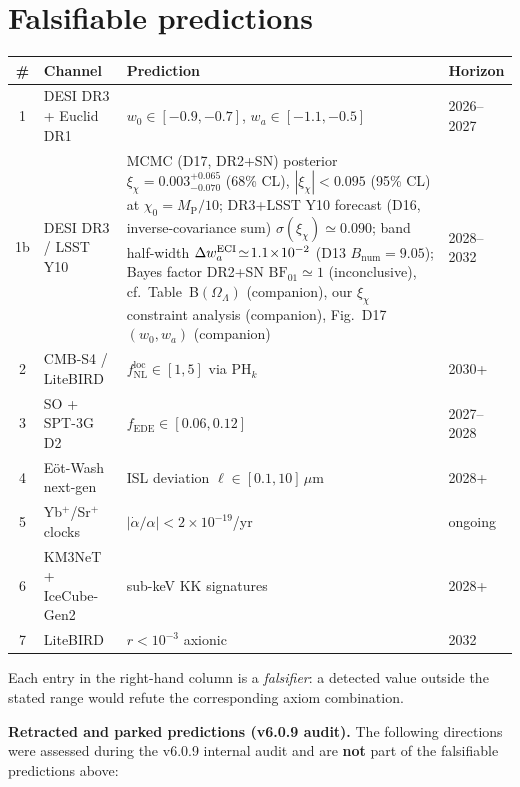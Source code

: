 \documentclass[reprint,amsmath,amssymb,aps,prd,superscriptaddress]{revtex4-2}
\providecommand{\1}{\mathbf{1}}
\begin{document}
\section{Falsifiable predictions}\label{sec:pred}

\begin{table}[h]
\centering
\begin{tabular}{@{}clll@{}}
\hline
\# & Channel & Prediction & Horizon \\
\hline
1 & DESI DR3 + Euclid DR1 & $w_0 \in [-0.9, -0.7]$, $w_a \in [-1.1, -0.5]$ & 2026--2027 \\
1b & DESI DR3 / LSST Y10 & MCMC (D17, DR2+SN) posterior $\xi_\chi=0.003^{+0.065}_{-0.070}$ (68\% CL), $|\xi_\chi|<0.095$ (95\% CL) at $\chi_0=M_\mathrm{P}/10$; DR3+LSST Y10 forecast (D16, inverse-covariance sum) $\sigma(\xi_\chi)\!\simeq\!0.090$; band half-width $\Delta w_a^{\rm ECI}\!\simeq\!1.1\!\times\!10^{-2}$ (D13 $B_{\mathrm{num}}=9.05$); Bayes factor DR2+SN $\mathrm{BF}_{01}\simeq 1$ (inconclusive), cf.\ Table~B$(\Omega_\Lambda)$ (companion), our $\xi_\chi$ constraint analysis (companion), Fig.~D17 $(w_0,w_a)$ (companion) & 2028--2032 \\
2 & CMB-S4 / LiteBIRD & $f_{\mathrm{NL}}^{\mathrm{loc}} \in [1, 5]$ via $\mathrm{PH}_k$ & 2030+ \\
3 & SO + SPT-3G D2 & $f_{\mathrm{EDE}} \in [0.06, 0.12]$ & 2027--2028 \\
4 & Eöt-Wash next-gen & ISL deviation $\ell \in [0.1, 10]\,\mu$m & 2028+ \\
5 & Yb$^+$/Sr$^+$ clocks & $|\dot \alpha / \alpha| < 2 \times 10^{-19}$/yr & ongoing \\
6 & KM3NeT + IceCube-Gen2 & sub-keV KK signatures & 2028+ \\
7 & LiteBIRD & $r < 10^{-3}$ axionic & 2032 \\
\hline
\end{tabular}
\end{table}

Each entry in the right-hand column is a \emph{falsifier}: a detected value outside the stated range would refute the corresponding axiom combination.

\medskip\noindent\textbf{Retracted and parked predictions (v6.0.9 audit).}
The following directions were assessed during the v6.0.9 internal audit and are \textbf{not} part of the falsifiable predictions above:
\end{document}
